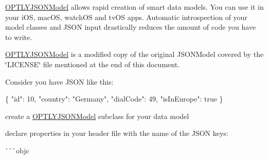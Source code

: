 \mbox{\hyperlink{interface_o_p_t_l_y_j_s_o_n_model}{O\+P\+T\+L\+Y\+J\+S\+O\+N\+Model}} allows rapid creation of smart data models. You can use it in your i\+OS, mac\+OS, watch\+OS and tv\+OS apps. Automatic introspection of your model classes and J\+S\+ON input drastically reduces the amount of code you have to write.

\mbox{\hyperlink{interface_o_p_t_l_y_j_s_o_n_model}{O\+P\+T\+L\+Y\+J\+S\+O\+N\+Model}} is a modified copy of the original J\+S\+O\+N\+Model covered by the \char`\"{}\+L\+I\+C\+E\+N\+S\+E\char`\"{} file mentioned at the end of this document.

Consider you have J\+S\+ON like this\+:


\begin{DoxyCode}
\{ "id": 10, "country": "Germany", "dialCode": 49, "isInEurope": true \}
\end{DoxyCode}



\begin{DoxyItemize}
\item create a \mbox{\hyperlink{interface_o_p_t_l_y_j_s_o_n_model}{O\+P\+T\+L\+Y\+J\+S\+O\+N\+Model}} subclass for your data model
\item declare properties in your header file with the name of the J\+S\+ON keys\+:
\end{DoxyItemize}

\`{}\`{}\`{}objc 
